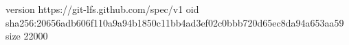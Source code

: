 version https://git-lfs.github.com/spec/v1
oid sha256:20656adb606f110a9a94b1850c11bb4ad3ef02c0bbb720d65ec8da94a653aa59
size 22000
